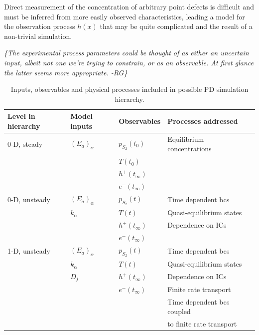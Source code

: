 \documentclass[11pt]{article}
\newcommand{\remrg}[1]{ {\it \color{drkgrn} \{#1 -RG\}}}
\begin{document}
Direct measurement of the concentration of arbitrary point defects is
difficult and must be inferred from more easily observed
characteristics, leading a model for the observation process $h(x)$
that may be quite complicated and the result of a non-trivial
simulation. 

\remrg{The experimental process parameters could be
  thought of as either an uncertain input, albeit not one we're
  trying to constrain, or as an observable. At first glance the latter
  seems more appropriate.}

\begin{table}[h]
  \centering
  \begin{tabular}{l l l l l}
    Level in hierarchy & Model inputs & Observables & Processes
    addressed \\
    \hline
    0-D, steady & $(E_a)_\alpha$  & $p_{S_2}(t_0)$ & Equilibrium
    concentrations \\
    & & $T(t_0)$ & \\
    & & $h^+(t_\infty)$ & \\
    & & $e^-(t_\infty)$ & \\
    \hline
    0-D, unsteady & $(E_a)_\alpha$& $p_{S_2}(t)$ & Time dependent
    bcs \\
    & $k_\alpha$ & $T(t)$ & Quasi-equilibrium states \\
    & & $h^+(t_\infty)$ & Dependence on ICs \\
    & & $e^-(t_\infty)$ & \\

    \hline
    1-D, unsteady & $(E_a)_\alpha$& $p_{S_2}(t)$ & Time dependent
    bcs \\
    & $k_\alpha$ & $T(t)$ & Quasi-equilibrium states \\
     & $D_j$ &$h^+(t_\infty)$ &  Dependence on ICs \\
     & & $e^-(t_\infty)$ & Finite rate transport \\
     & && Time dependent bcs coupled \\
     & & &    to finite rate transport \\
  \end{tabular}
  \caption{Inputs, observables and physical processes included in
    possible PD simulation hierarchy. }
  \label{tab:pdh}
\end{table}




 
\end{document}

